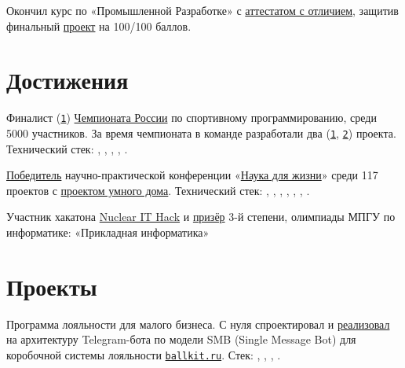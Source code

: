 \documentclass[margin,line]{resume}
\begin{document}
\begin{resume}
{\begin{description}[leftmargin=0pt, itemindent=*, itemsep=8pt]
      \item[\href{https://lyceum.yandex.ru/}{Лицей
        Академии Яндекса}.] Окончил курс
        по «Промышленной Разработке» с
        \href{https://alchemmist.github.io/CV/attachments/yandex-lyceum.pdf}{аттестатом
        с отличием}, защитив финальный
        \href{https://github.com/starship-crew}{проект} на 100/100 баллов.

  \end{description}}

  \section{\mysidestyle Достижения}
  Финалист
  (\href{https://alchemmist.github.io/CV/attachments/russian-chemp-final.pdf}{\texttt{1}})
  \href{https://fsp-russia.ru/}{Чемпионата
  России} по спортивному
  программированию, среди 5000 участников. За время чемпионата в
  команде разработали два
  (\href{https://github.com/alchemmist/sport-afisha/}{\texttt{1}},
  \href{https://github.com/alchemmist/sportprog}{\texttt{2}})
  проекта. Технический стек:
  , ,
  ,
  ,
  .

  \href{https://alchemmist.github.io/CV/attachments/scince-for-life-win.pdf}{Победитель}
  научно-практической конференции
  «\href{https://conf.profil.mos.ru/academ}{Наука для
  жизни}» среди 117 проектов с
  \href{https://github.com/smart-cab/}{проектом умного
  дома}. Технический стек: ,
  , , ,
  , , .

  Участник хакатона \href{https://nuclearhack.mephi.ru/}{Nuclear
  IT Hack} и
  \href{https://alchemmist.github.io/CV/attachments/informatics-olimpic.pdf}{призёр}
  3-й степени, олимпиады МПГУ по информатике: «Прикладная информатика»

  \section{\mysidestyle Проекты}\vspace{0.7mm}
  \begin{description}[leftmargin=0pt, itemindent=*, itemsep=3pt, topsep=2pt,
      parsep=0pt]

    \item[Ballkit:] Программа лояльности для малого бизнеса.
      С нуля спроектировал и
      \href{https://github.com/ballkit/ballkit-platform}{реализовал}
      на  архитектуру Telegram-бота по модели SMB
      (Single Message Bot) для коробочной системы лояльности
      \href{https://ballkit.ru}{\texttt{ballkit.ru}}.
      Стек: , ,
      , .


\end{description}
\end{resume}
\end{document}
